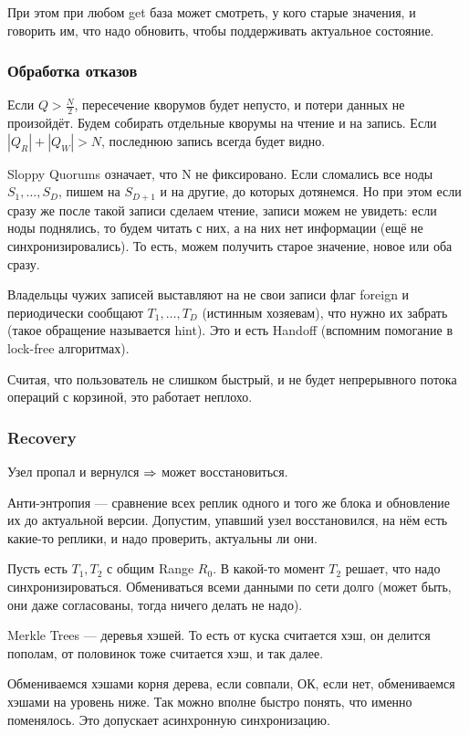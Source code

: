 При этом при любом get база может смотреть, у кого старые значения, и говорить им, что надо обновить, чтобы поддерживать актуальное состояние.

\subsubsection{Обработка отказов}
Если $Q>\frac{N}{2}$, пересечение кворумов будет непусто, и потери данных не произойдёт.
Будем собирать отдельные кворумы на чтение и на запись. Если $|Q_R| + |Q_W|>N$, последнюю запись всегда будет видно.

Sloppy Quorums означает, что N не фиксировано. Если сломались все ноды $S_1, \dots, S_D$, пишем на $S_{D+1}$ и на другие, до которых дотянемся. Но при этом если сразу же после такой записи сделаем чтение, записи можем не увидеть: если ноды поднялись, то будем читать с них, а на них нет информации (ещё не синхронизировались). То есть, можем получить старое значение, новое или оба сразу.

Владельцы чужих записей выставляют на не свои записи флаг foreign и периодически сообщают $T_1, \dots, T_D$ (истинным хозяевам), что нужно их забрать (такое обращение называется hint). Это и есть Handoff (вспомним помогание в lock-free алгоритмах).

Считая, что пользователь не слишком быстрый, и не будет непрерывного потока операций с корзиной, это работает неплохо.

\subsubsection{Recovery}
Узел пропал и вернулся $\Rightarrow$ может восстановиться. 

Анти-энтропия --- сравнение всех реплик одного и того же блока и обновление их до актуальной версии. Допустим, упавший узел восстановился, на нём есть какие-то реплики, и надо проверить, актуальны ли они.
 
Пусть есть $T_1, T_2$ с общим Range $R_0$. В какой-то момент $T_2$ решает, что надо синхронизироваться. Обмениваться всеми данными по сети долго (может быть, они даже согласованы, тогда ничего делать не надо).

Merkle Trees --- деревья хэшей. То есть от куска считается хэш, он делится пополам, от половинок тоже считается хэш, и так далее.

Обмениваемся хэшами корня дерева, если совпали, ОК, если нет, обмениваемся хэшами на уровень ниже. Так можно вполне быстро понять, что именно поменялось.
Это допускает асинхронную синхронизацию.


